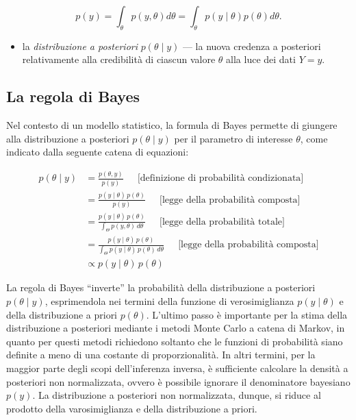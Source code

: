 \documentclass[
]{memoir}
\providecommand{\tightlist}{%
  \setlength{\itemsep}{0pt}\setlength{\parskip}{0pt}}
\theoremstyle{definition}
\theoremstyle{definition}
\theoremstyle{definition}
\theoremstyle{definition}
\theoremstyle{remark}
\begin{document}
\[
p(y) = \int_\theta p(y, \theta) d\theta = \int_\theta p(y \mid \theta) p(\theta) d\theta.
\]

\begin{itemize}
\tightlist
\item
  la \emph{distribuzione a posteriori} \(p(\theta \mid y)\) --- la nuova credenza a posteriori relativamente alla credibilità di ciascun valore \(\theta\) alla luce dei dati \(Y = y\).
\end{itemize}

\hypertarget{la-regola-di-bayes}{%
\subsection{La regola di Bayes}\label{la-regola-di-bayes}}

Nel contesto di un modello statistico, la formula di Bayes permette di giungere alla distribuzione a posteriori \(p(\theta \mid y)\) per il parametro di interesse \(\theta\), come indicato dalla seguente catena di equazioni:

\begin{align}
p(\theta \mid y)  &= \displaystyle \frac{p(\theta,y)}{p(y)}
 \ \ \ \ \ \mbox{ [definizione di probabilità condizionata]}
\\
&= \displaystyle \frac{p(y \mid \theta) \, p(\theta)}{p(y)}
 \ \ \ \ \ \mbox{ [legge della probabilità composta]}
\\
&=  \displaystyle \frac{p(y \mid\theta) \, p(\theta)}
                        {\int_{\Theta} p(y,\theta) \, d\theta}
 \ \ \ \ \ \mbox{ [legge della probabilità totale]}
\\
&= \displaystyle \frac{p(y \mid\theta) \, p(\theta)}
                        {\int_{\Theta} p(y \mid\theta) \, p(\theta) \, d\theta}
 \ \ \ \ \ \mbox{ [legge della probabilità composta]}
\\
& \propto \displaystyle p(y \mid\theta) \, p(\theta)
\label{eq:bayesmodel}
\end{align}

La regola di Bayes ``inverte'' la probabilità della distribuzione a posteriori \(p(\theta \mid y)\), esprimendola nei termini della funzione di verosimiglianza \(p(y \mid \theta)\) e della distribuzione a priori \(p(\theta)\). L'ultimo passo è importante per la stima della distribuzione a posteriori mediante i metodi Monte Carlo a catena di Markov, in quanto per questi metodi richiedono soltanto che le funzioni di probabilità siano definite a meno di una costante di proporzionalità. In altri termini, per la maggior parte degli scopi dell'inferenza inversa, è sufficiente calcolare la densità a posteriori non normalizzata, ovvero è possibile ignorare il denominatore bayesiano \(p(y)\). La distribuzione a posteriori non normalizzata, dunque, si riduce al prodotto della varosimiglianza e della distribuzione a priori.
\end{document}
